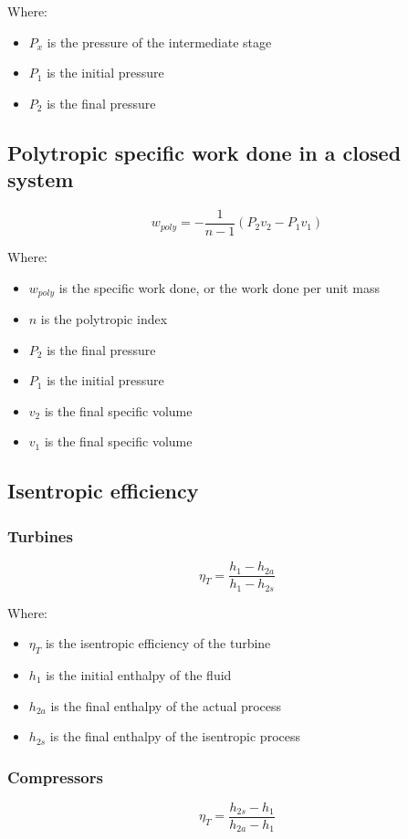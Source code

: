 \documentclass[11pt]{article}
\begin{document}
Where:
\begin{itemize}
\item \(P_x\) is the pressure of the intermediate stage
\item \(P_1\) is the initial pressure
\item \(P_2\) is the final pressure
\end{itemize}

 \newpage

\subsection{Polytropic specific work done in a closed system}
\label{sec:org946d6d6}
\[w_{poly} = - \frac{1}{n - 1} (P_2 v_2 - P_1 v_1)\]

Where:
\begin{itemize}
\item \(w_{poly}\) is the specific work done, or the work done per unit mass
\item \(n\) is the polytropic index
\item \(P_2\) is the final pressure
\item \(P_1\) is the initial pressure
\item \(v_2\) is the final specific volume
\item \(v_1\) is the final specific volume
\end{itemize}

\subsection{Isentropic efficiency}
\label{sec:orgc8b88d9}

\subsubsection{Turbines}
\label{sec:org4630fae}
\[\eta_T = \frac{h_1 - h_{2a}}{h_1 - h_{2s}}\]

Where:
\begin{itemize}
\item \(\eta_T\) is the isentropic efficiency of the turbine
\item \(h_1\) is the initial enthalpy of the fluid
\item \(h_{2a}\) is the final enthalpy of the actual process
\item \(h_{2s}\) is the final enthalpy of the isentropic process
\end{itemize}

\subsubsection{Compressors}
\label{sec:org4e3e03e}
\[\eta_T = \frac{h_{2s} - h_1}{h_{2a} - h_1}\]
\end{document}
